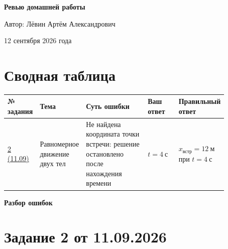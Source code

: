 \documentclass[12pt,a4paper]{article}
\begin{document}
\begin{titlepage}
\centering
\vspace*{\fill}

{\LARGE\bfseries Ревью домашней работы\par}

\vspace{1.2cm}

{\large Автор: Лёвин Артём Александрович\par}

\vspace{0.6cm}

{\large 12 сентября 2026 года\par}

\vspace*{\fill}


\end{titlepage}

\newpage

\section*{Сводная таблица}

{\small
\begin{center}
\begin{tabular}{p{0.11\linewidth} p{0.18\linewidth} p{0.28\linewidth} p{0.14\linewidth} p{0.16\linewidth}}
\toprule
\textbf{№ задания} & \textbf{Тема} & \textbf{Суть ошибки} & \textbf{Ваш ответ} & \textbf{Правильный ответ} \\
\midrule
\hyperref[task:2026-09-11-2]{2 (11.09)} &
Равномерное движение двух тел &
Не найдена координата точки встречи: решение остановлено после нахождения времени &
$t=4\ \text{с}$ &
$x_{\text{встр}}=12\ \text{м}$ при $t=4\ \text{с}$ \\
\bottomrule
\end{tabular}
\end{center}
}

\newpage
\vspace*{\fill}
\begin{center}
{\LARGE\bfseries Разбор ошибок}
\end{center}
\vspace*{\fill}
\newpage

\label{task:2026-09-11-2}
\section*{Задание 2 от 11.09.2026}
\end{document}
